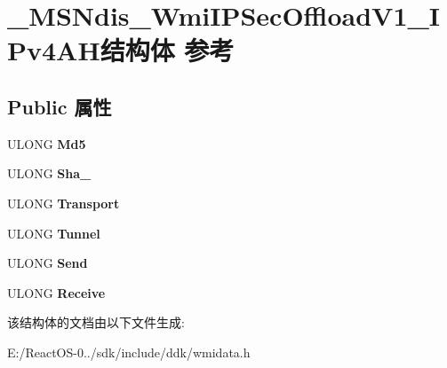 \hypertarget{struct___m_s_ndis___wmi_i_p_sec_offload_v1___i_pv4_a_h}{}\section{\+\_\+\+M\+S\+Ndis\+\_\+\+Wmi\+I\+P\+Sec\+Offload\+V1\+\_\+\+I\+Pv4\+A\+H结构体 参考}
\label{struct___m_s_ndis___wmi_i_p_sec_offload_v1___i_pv4_a_h}
\subsection*{Public 属性}
\begin{DoxyCompactItemize}
\item 
\mbox{\label{struct___m_s_ndis___wmi_i_p_sec_offload_v1___i_pv4_a_h_a650c68ff5468a772a40af73481459f4c}} 
U\+L\+O\+NG {\bfseries Md5}
\item 
\mbox{\label{struct___m_s_ndis___wmi_i_p_sec_offload_v1___i_pv4_a_h_a6075de215d74b0e1a149f3f9fad6122f}} 
U\+L\+O\+NG {\bfseries Sha\+\_}
\item 
\mbox{\label{struct___m_s_ndis___wmi_i_p_sec_offload_v1___i_pv4_a_h_aa021febc501038b8fb6a1a5904da3838}} 
U\+L\+O\+NG {\bfseries Transport}
\item 
\mbox{\label{struct___m_s_ndis___wmi_i_p_sec_offload_v1___i_pv4_a_h_a88ac0246ddcf61edfdde1f6235bb399b}} 
U\+L\+O\+NG {\bfseries Tunnel}
\item 
\mbox{\label{struct___m_s_ndis___wmi_i_p_sec_offload_v1___i_pv4_a_h_a8c9e101f58d8c3d9bdb3433e65b21f95}} 
U\+L\+O\+NG {\bfseries Send}
\item 
\mbox{\label{struct___m_s_ndis___wmi_i_p_sec_offload_v1___i_pv4_a_h_a170c1298f3d23cacfbc12d04c14006c6}} 
U\+L\+O\+NG {\bfseries Receive}
\end{DoxyCompactItemize}


该结构体的文档由以下文件生成\+:\begin{DoxyCompactItemize}
\item 
E\+:/\+React\+O\+S-\/0../sdk/include/ddk/wmidata.\+h\end{DoxyCompactItemize}
